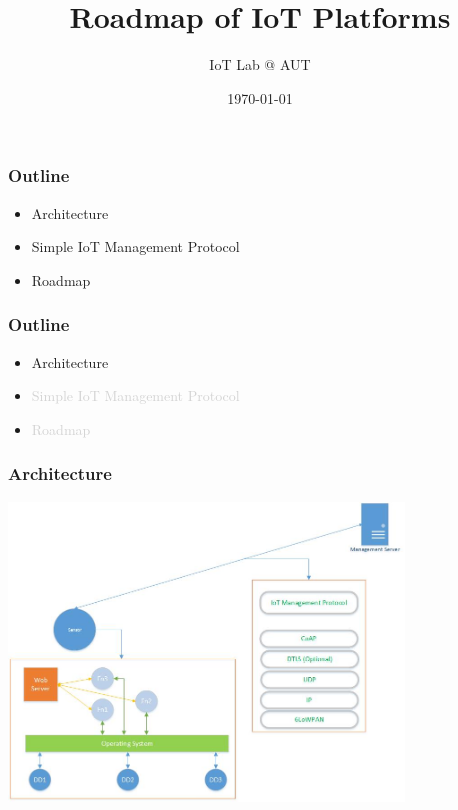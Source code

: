 \documentclass{beamer}
\title[CoAP middle server for IoT platform]{Roadmap of IoT Platforms}
\author{IoT Lab @ AUT}
\institute[] {
  Amirkabir University of Technology
}
\date{\today}
\begin{document}
\begin{frame}
\titlepage
\end{frame}


\begin{frame}
	\frametitle{Outline}
	\vspace{.1cm}
	\begin{itemize}
		\justifying
		\item Architecture
		\item<2-> Simple IoT Management Protocol
		\item<3-> Roadmap
	\end{itemize}
\end{frame}

\begin{frame}
	\frametitle{Outline}
	\vspace{.1cm}
	\begin{itemize}
		\justifying
		\item Architecture
		\item \textcolor{LightGray}{Simple IoT Management Protocol}
		\item \textcolor{LightGray}{Roadmap}
	\end{itemize}
\end{frame}

\begin{frame}
	\frametitle{Architecture}
	\vspace{.1cm}
	\hspace*{.75cm} \includegraphics[width=10.5cm]{../architecture/architecture.jpg}
\end{frame}
\end{document}
